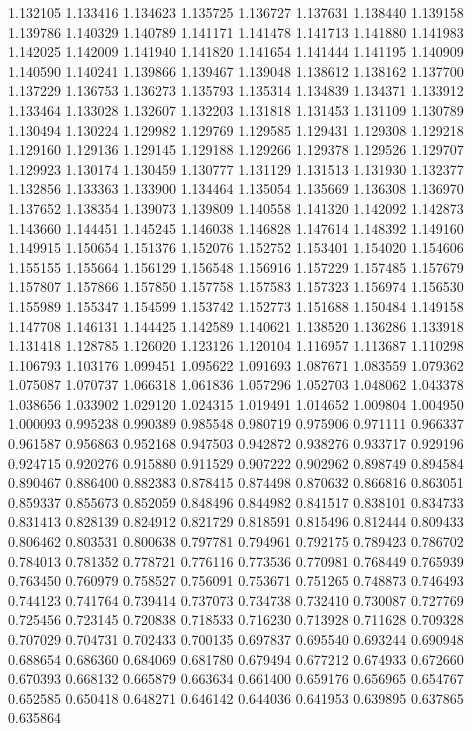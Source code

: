 1.132105
1.133416
1.134623
1.135725
1.136727
1.137631
1.138440
1.139158
1.139786
1.140329
1.140789
1.141171
1.141478
1.141713
1.141880
1.141983
1.142025
1.142009
1.141940
1.141820
1.141654
1.141444
1.141195
1.140909
1.140590
1.140241
1.139866
1.139467
1.139048
1.138612
1.138162
1.137700
1.137229
1.136753
1.136273
1.135793
1.135314
1.134839
1.134371
1.133912
1.133464
1.133028
1.132607
1.132203
1.131818
1.131453
1.131109
1.130789
1.130494
1.130224
1.129982
1.129769
1.129585
1.129431
1.129308
1.129218
1.129160
1.129136
1.129145
1.129188
1.129266
1.129378
1.129526
1.129707
1.129923
1.130174
1.130459
1.130777
1.131129
1.131513
1.131930
1.132377
1.132856
1.133363
1.133900
1.134464
1.135054
1.135669
1.136308
1.136970
1.137652
1.138354
1.139073
1.139809
1.140558
1.141320
1.142092
1.142873
1.143660
1.144451
1.145245
1.146038
1.146828
1.147614
1.148392
1.149160
1.149915
1.150654
1.151376
1.152076
1.152752
1.153401
1.154020
1.154606
1.155155
1.155664
1.156129
1.156548
1.156916
1.157229
1.157485
1.157679
1.157807
1.157866
1.157850
1.157758
1.157583
1.157323
1.156974
1.156530
1.155989
1.155347
1.154599
1.153742
1.152773
1.151688
1.150484
1.149158
1.147708
1.146131
1.144425
1.142589
1.140621
1.138520
1.136286
1.133918
1.131418
1.128785
1.126020
1.123126
1.120104
1.116957
1.113687
1.110298
1.106793
1.103176
1.099451
1.095622
1.091693
1.087671
1.083559
1.079362
1.075087
1.070737
1.066318
1.061836
1.057296
1.052703
1.048062
1.043378
1.038656
1.033902
1.029120
1.024315
1.019491
1.014652
1.009804
1.004950
1.000093
0.995238
0.990389
0.985548
0.980719
0.975906
0.971111
0.966337
0.961587
0.956863
0.952168
0.947503
0.942872
0.938276
0.933717
0.929196
0.924715
0.920276
0.915880
0.911529
0.907222
0.902962
0.898749
0.894584
0.890467
0.886400
0.882383
0.878415
0.874498
0.870632
0.866816
0.863051
0.859337
0.855673
0.852059
0.848496
0.844982
0.841517
0.838101
0.834733
0.831413
0.828139
0.824912
0.821729
0.818591
0.815496
0.812444
0.809433
0.806462
0.803531
0.800638
0.797781
0.794961
0.792175
0.789423
0.786702
0.784013
0.781352
0.778721
0.776116
0.773536
0.770981
0.768449
0.765939
0.763450
0.760979
0.758527
0.756091
0.753671
0.751265
0.748873
0.746493
0.744123
0.741764
0.739414
0.737073
0.734738
0.732410
0.730087
0.727769
0.725456
0.723145
0.720838
0.718533
0.716230
0.713928
0.711628
0.709328
0.707029
0.704731
0.702433
0.700135
0.697837
0.695540
0.693244
0.690948
0.688654
0.686360
0.684069
0.681780
0.679494
0.677212
0.674933
0.672660
0.670393
0.668132
0.665879
0.663634
0.661400
0.659176
0.656965
0.654767
0.652585
0.650418
0.648271
0.646142
0.644036
0.641953
0.639895
0.637865
0.635864
